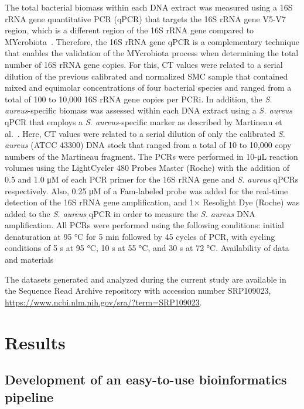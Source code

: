 The total bacterial biomass within each DNA extract was measured using a 16S rRNA gene quantitative PCR (qPCR) that targets the 16S rRNA gene V5-V7 region, which is a different region of the 16S rRNA gene compared to MYcrobiota~\cite{yang2002quantitative}. Therefore, the 16S rRNA gene qPCR is a complementary technique that enables the validation of the MYcrobiota process when determining the total number of 16S rRNA gene copies. For this, CT values were related to a serial dilution of the previous calibrated and normalized SMC sample that contained mixed and equimolar concentrations of four bacterial species and ranged from a total of 100 to 10,000 16S rRNA gene copies per PCRi\@. In addition, the \textit{S. aureus}-specific biomass was assessed within each DNA extract using a \textit{S. aureus} qPCR that employs a \textit{S. aureus}-specific marker as described by Martineau et al.~\cite{martineau1998species}. Here, CT values were related to a serial dilution of only the calibrated \textit{S. aureus} (ATCC 43300) DNA stock that ranged from a total of 10 to 10,000 copy numbers of the Martineau fragment. The PCRs were performed in 10-μL reaction volumes using the LightCycler 480 Probes Master (Roche) with the addition of 0.5 and 1.0 μM of each PCR primer for the 16S rRNA gene and \textit{S. aureus} qPCRs respectively. Also, 0.25 μM of a Fam-labeled probe was added for the real-time detection of the 16S rRNA gene amplification, and 1× Resolight Dye (Roche) was added to the \textit{S. aureus} qPCR in order to measure the \textit{S. aureus} DNA amplification. All PCRs were performed using the following conditions: initial denaturation at 95 °C for 5 min followed by 45 cycles of PCR, with cycling conditions of 5 s at 95 °C, 10 s at 55 °C, and 30 s at 72 °C.
Availability of data and materials

The datasets generated and analyzed during the current study are available in the Sequence Read Archive repository with accession number SRP109023, \url{https://www.ncbi.nlm.nih.gov/sra/?term=SRP109023}.


\section*{Results}

\subsection*{Development of an easy-to-use bioinformatics pipeline}

